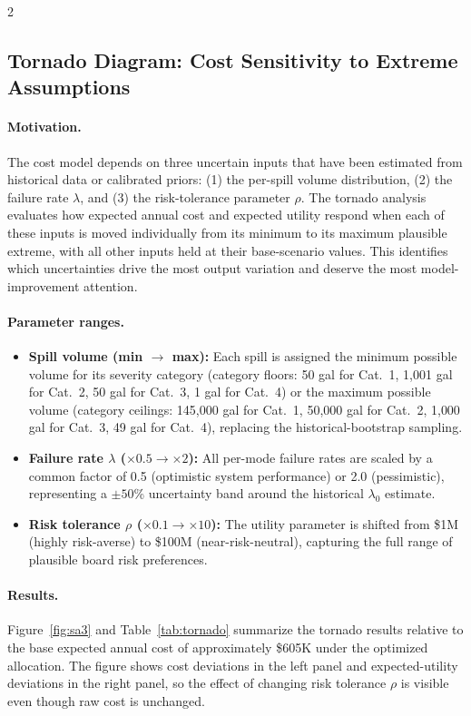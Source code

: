 \documentclass[10pt]{article}
\begin{document}
\begin{multicols}{2}
\subsection{Tornado Diagram: Cost Sensitivity to Extreme Assumptions}

\paragraph{Motivation.}
The cost model depends on three uncertain inputs that have been
estimated from historical data or calibrated priors: (1) the
per-spill volume distribution, (2) the failure rate $\lambda$, and
(3) the risk-tolerance parameter $\rho$. The tornado analysis
evaluates how expected annual cost and expected utility respond when
each of these inputs is moved individually from its minimum to its
maximum plausible extreme, with all other inputs held at their
base-scenario values. This identifies which uncertainties drive
the most output variation and deserve the most model-improvement
attention.

\paragraph{Parameter ranges.}
\begin{itemize}[noitemsep]
  \item \textbf{Spill volume (min $\to$ max):} Each spill is assigned
    the minimum possible volume for its severity category (category
    floors: 50 gal for Cat.~1, 1{,}001 gal for Cat.~2, 50 gal for
    Cat.~3, 1 gal for Cat.~4) or the maximum possible volume (category
    ceilings: 145{,}000 gal for Cat.~1, 50{,}000 gal for Cat.~2,
    1{,}000 gal for Cat.~3, 49 gal for Cat.~4), replacing the
    historical-bootstrap sampling.
  \item \textbf{Failure rate $\lambda$ ($\times 0.5 \to \times 2$):}
    All per-mode failure rates are scaled by a common factor of 0.5
    (optimistic system performance) or 2.0 (pessimistic), representing
    a $\pm 50$\% uncertainty band around the historical $\lambda_0$
    estimate.
  \item \textbf{Risk tolerance $\rho$ ($\times 0.1 \to \times 10$):}
    The utility parameter is shifted from \$1M (highly risk-averse) to
    \$100M (near-risk-neutral), capturing the full range of plausible
    board risk preferences.
\end{itemize}

\paragraph{Results.}
Figure~\ref{fig:sa3} and Table~\ref{tab:tornado} summarize the
tornado results relative to the base expected annual cost of
approximately \$605K under the optimized allocation. The figure
shows cost deviations in the left panel and expected-utility
deviations in the right panel, so the effect of changing
risk tolerance $\rho$ is visible even though raw cost is unchanged.


\end{multicols}
\end{document}
